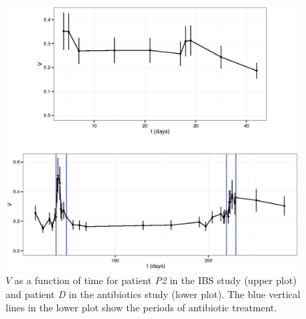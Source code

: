 \begin{figure}
	\centering 
	\includegraphics[width=0.99\textwidth]{figs/Fig7.eps}	
\caption{$V$ as a function of time for patient \emph{P2} in the IBS study\cite{IBS} (upper plot) and patient \emph{D} in the antibiotics study\cite{antibiotic} (lower plot). The blue vertical lines in the lower plot show the periods of antibiotic treatment.}
\label{fig:tempevo2}
\end{figure}

